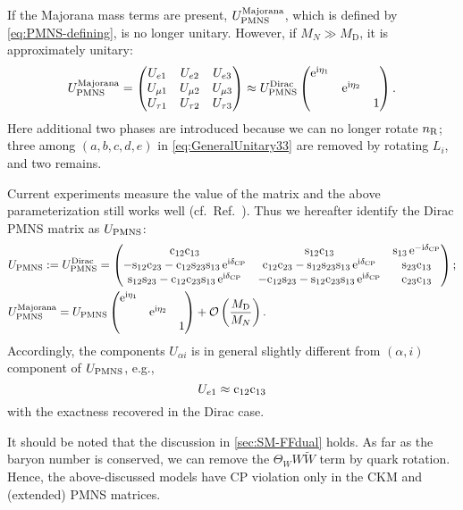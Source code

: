 \documentclass[CheatSheet]{subfiles}
\newcommand\MD[1][]{M_{\mathrm{D}#1}}
\newcommand\MN[1][]{M_{N#1}}
\begin{document}
If the Majorana mass terms are present, $U_{\mathrm{PMNS}}^{\text{Majorana}}$, which is defined by \cref{eq:PMNS-defining}, is no longer unitary.
However, if $\MN\gg\MD$, it is approximately unitary:
\begin{equation}
   U_{\mathrm{PMNS}}^{\text{Majorana}}=
\begin{pmatrix}
 U_{e1} & U_{e2} & U_{e3}\\
 U_{\mu1} & U_{\mu2} & U_{\mu3}\\
 U_{\tau1} & U_{\tau2} & U_{\tau3}
 \end{pmatrix}
\approx
U_{\mathrm{PMNS}}^{\text{Dirac}}
\begin{pmatrix}\mathop{}\!\mathrm{e}^{\mathrm{i}\eta_1} \\ & \mathop{}\!\mathrm{e}^{\mathrm{i}\eta_2}\\&&1\end{pmatrix}.
\end{equation}
Here additional two phases are introduced because we can no longer rotate $n_{\mathrm{R}}$; three among $(a,b,c,d,e)$ in \cref{eq:GeneralUnitary33} are removed by rotating $L_i$, and two remains.

Current experiments measure the value of the matrix and the above parameterization still works well (cf.~Ref.~\cite{NUFIT}).
Thus we hereafter identify the Dirac PMNS matrix as $U_{\mathrm{PMNS}}$:
\begin{align}
 &U\w{PMNS}:=U\w{PMNS}^{\text{Dirac}}=
 \pmat{
 \co{12} \co{13} & \si{12} \co{13} & \si{13} \ee^{-\ii\delta\w{CP}}\\
 -\si{12} \co{23} - \co{12} \si{23} \si{13} \ee^{\ii\delta\w{CP}}& \co{12} \co{23} - \si{12}\si{23}\si{13} \ee^{\ii\delta\w{CP}}& \si{23}\co{13}\\
  \si{12}\si{23} - \co{12} \co{23} \si{13}\ee^{\ii\delta\w{CP}} & -\co{12}\si{23}-\si{12}\co{23}\si{13}\ee^{\ii\delta\w{CP}} & \co{23} \co{13}
};\\
 &U\w{PMNS}^{\text{Majorana}} = U\w{PMNS}\pmat{\ee^{\ii\eta_1} \\ & \ee^{\ii\eta_2}\\&&1}
+\Order\left(\frac{\MD}{\MN}\right).
\end{align}
Accordingly, the components $U_{\alpha i}$ is in general slightly different from $(\alpha,i)$ component of $U_{\mathrm{PMNS}}$, e.g.,
\begin{equation*}
 U_{e1}\approx \mathrm{c}_{12}\mathrm{c}_{13}
\end{equation*}
with the exactness recovered in the Dirac case.

It should be noted that the discussion in \cref{sec:SM-FFdual} holds.
As far as the baryon number is conserved, we can remove the $\Theta_W W\tilde W$ term by quark rotation.
Hence, the above-discussed models have CP violation only in the CKM and (extended) PMNS matrices.
\end{document}
